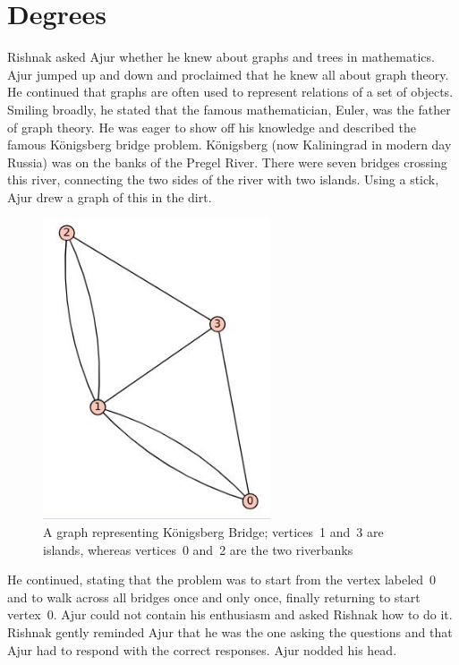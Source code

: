 \chapter{Degrees}
Rishnak asked Ajur whether he knew about graphs and trees in mathematics. Ajur jumped up and down and proclaimed that he knew all about graph theory. He continued that graphs are often used to represent relations of a set of objects. Smiling broadly, he stated that the famous mathematician, Euler, was the father of graph theory. He was eager to show off his knowledge and described the famous  K\"{o}nigsberg bridge problem. K\"{o}nigsberg (now Kaliningrad in modern day Russia) was on the banks of the Pregel River.  There were seven bridges crossing this river, connecting the two sides of the river with two islands. Using a stick, Ajur drew a graph of this in the dirt.
\begin{figure}
\begin{center}
\includegraphics[width=0.6\textwidth]{konigsberg.JPG}
\caption{A graph representing K\"{o}nigsberg Bridge; vertices~1 and~3 are islands, whereas vertices~0 and~2 are the two riverbanks}\label{kon}
\end{center}
\end{figure}

He continued, stating that the problem was to start from the vertex labeled~0 and to walk across all bridges once and only once, finally returning to start vertex~0. Ajur could not contain his enthusiasm and asked Rishnak how to do it. Rishnak gently reminded Ajur that he was the one asking the questions and that Ajur had to respond with the correct responses. Ajur nodded his head.

